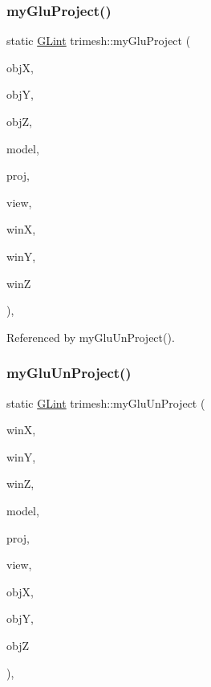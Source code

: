 \subsubsection{\texorpdfstring{my\+Glu\+Project()}{myGluProject()}}
{\footnotesize\ttfamily static \hyperlink{namespacetrimesh_aeccc290e30b317c861fb146956528187}{G\+Lint} trimesh\+::my\+Glu\+Project (\begin{DoxyParamCaption}\item[{G\+Ldouble}]{objX,  }\item[{G\+Ldouble}]{objY,  }\item[{G\+Ldouble}]{objZ,  }\item[{const G\+Ldouble $\ast$}]{model,  }\item[{const G\+Ldouble $\ast$}]{proj,  }\item[{const \hyperlink{namespacetrimesh_aeccc290e30b317c861fb146956528187}{G\+Lint} $\ast$}]{view,  }\item[{G\+Ldouble $\ast$}]{winX,  }\item[{G\+Ldouble $\ast$}]{winY,  }\item[{G\+Ldouble $\ast$}]{winZ }\end{DoxyParamCaption})\hspace{0.3cm}{\ttfamily [inline]}, {\ttfamily [static]}}



Referenced by my\+Glu\+Un\+Project().

\mbox{\label{namespacetrimesh_a152a54796716691bc240468cf1d52bd7}} 
\subsubsection{\texorpdfstring{my\+Glu\+Un\+Project()}{myGluUnProject()}}
{\footnotesize\ttfamily static \hyperlink{namespacetrimesh_aeccc290e30b317c861fb146956528187}{G\+Lint} trimesh\+::my\+Glu\+Un\+Project (\begin{DoxyParamCaption}\item[{G\+Ldouble}]{winX,  }\item[{G\+Ldouble}]{winY,  }\item[{G\+Ldouble}]{winZ,  }\item[{const G\+Ldouble $\ast$}]{model,  }\item[{const G\+Ldouble $\ast$}]{proj,  }\item[{const \hyperlink{namespacetrimesh_aeccc290e30b317c861fb146956528187}{G\+Lint} $\ast$}]{view,  }\item[{G\+Ldouble $\ast$}]{objX,  }\item[{G\+Ldouble $\ast$}]{objY,  }\item[{G\+Ldouble $\ast$}]{objZ }\end{DoxyParamCaption})\hspace{0.3cm}{\ttfamily [inline]}, {\ttfamily [static]}}

